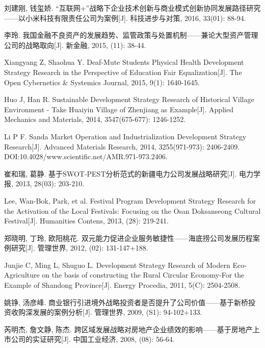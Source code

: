 \documentclass[UTF8, a4paper, 11pt]{ctexart}
\begin{document}
\begin{UnifiedBox}[height=25.4cm]
\begin{enumerate}[label={[}\arabic*{]}, leftmargin=2em, itemsep=0.15em, parsep=0pt]
\item 刘建刚, 钱玺娇. ``互联网+''战略下企业技术创新与商业模式创新协同发展路径研究——以小米科技有限责任公司为案例[J]. 科技进步与对策, 2016, 33(01): 88-94.

\item 李玲. 我国金融不良资产的发展趋势、监管政策与处置机制——兼论大型资产管理公司的战略取向[J]. 新金融, 2015, (11): 38-44.

\item Xiangyang Z, Shaohua Y. Deaf-Mute Students Physical Health Development Strategy Research in the Perspective of Education Fair Equalization[J]. The Open Cybernetics \& Systemics Journal, 2015, 9(1): 1640-1645.

\item Huo J, Han R. Sustainable Development Strategy Research of Historical Village Environment - Take Huaiyin Village of Zhenjiang as Example[J]. Applied Mechanics and Materials, 2014, 3547(675-677): 1246-1252.

\item Li P F. Sanda Market Operation and Industrialization Development Strategy Research[J]. Advanced Materials Research, 2014, 3255(971-973): 2406-2409. DOI:10.4028/www.scientific.net/AMR.971-973.2406.

\item 崔和瑞, 葛静. 基于SWOT-PEST分析范式的新疆电力公司发展战略研究[J]. 电力学报, 2013, 28(03): 203-210.

\item Lee, Wan-Bok, Park, et al. Festival Program Development Strategy Research for the Activation of the Local Festivals: Focusing on the Osan Doksanseong Cultural Festival[J]. Humanities Contens, 2013, (28): 219-241.

\item 郑晓明, 丁玲, 欧阳桃花. 双元能力促进企业服务敏捷性——海底捞公司发展历程案例研究[J]. 管理世界, 2012, (02): 131-147+188.

\item Junjie C, Ming L, Shuguo L. Development Strategy Research of Modern Eco-Agriculture on the basis of constructing the Rural Circular Economy-For the Example of Shandong Province[J]. Energy Procedia, 2011, 5(C): 2504-2508.

\item 姚铮, 汤彦峰. 商业银行引进境外战略投资者是否提升了公司价值——基于新桥投资收购深发展的案例分析[J]. 管理世界, 2009, (S1): 94-102+133.

\item 芮明杰, 詹文静, 陈杰. 跨区域发展战略对房地产企业绩效的影响——基于房地产上市公司的实证研究[J]. 中国工业经济, 2008, (08): 56-64.


\end{enumerate}
\end{UnifiedBox}
\end{document}
